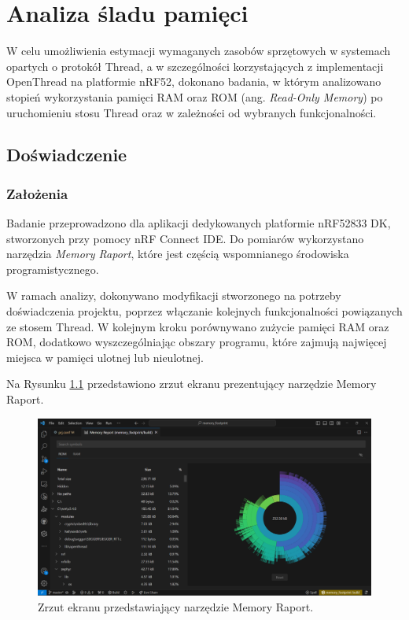 \chapter{Analiza śladu pamięci}

W celu umożliwienia estymacji wymaganych zasobów sprzętowych w systemach opartych o protokół Thread, a w szczególności korzystających z implementacji OpenThread na platformie nRF52, dokonano badania, w którym analizowano stopień wykorzystania pamięci RAM oraz ROM (ang. \textit{Read-Only Memory}) po uruchomieniu stosu Thread oraz w zależności od wybranych funkcjonalności.

\section{Doświadczenie}

    \subsection{Założenia}

    Badanie przeprowadzono dla aplikacji dedykowanych platformie nRF52833 DK, stworzonych przy pomocy nRF Connect IDE. Do pomiarów wykorzystano narzędzia \textit{Memory Raport}, które jest częścią wspomnianego środowiska programistycznego. 
    
    W ramach analizy, dokonywano modyfikacji stworzonego na potrzeby doświadczenia projektu, poprzez włączanie kolejnych funkcjonalności powiązanych ze stosem Thread. W kolejnym kroku porównywano zużycie pamięci RAM oraz ROM, dodatkowo wyszczególniając obszary programu, które zajmują najwięcej miejsca w pamięci ulotnej lub nieulotnej.

    Na Rysunku \ref{fig:memory-raport} przedstawiono zrzut ekranu prezentujący narzędzie Memory Raport.

    \begin{figure}[H]
        \centering
        \includegraphics[width=0.8\linewidth]{graphics/memory-raport.png}
        \caption{Zrzut ekranu przedstawiający narzędzie Memory Raport.}
        \label{fig:memory-raport}
    \end{figure}

